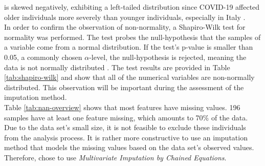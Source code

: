 is skewed negatively, exhibiting a left-tailed distribution since COVID-19 
affected older individuals more severely than younger individuals, especially 
in Italy \cite{RN193}. 
\\
In order to confirm the observation of non-normality, a Shapiro-Wilk test for 
normality was performed.
The test probes the null-hypothesis that the samples of a variable come from a 
normal distribution. If the test's p-value is smaller than 
0.05, a commonly chosen $\alpha$-level, the null-hypothesis is rejected, 
meaning the data is not normally distributed \cite{RN196}.
The test results are provided in Table \ref{tab:shapiro-wilk} and show 
that all of the numerical variables are non-normally distributed. This 
observation will be important during the assessment of the imputation method.
\\
Table \ref{tab:nan-overview} shows that most features have missing values. 196 
samples have at least one feature missing, which amounts to 70\% of the data. 
Due to the data set's small size, it is not feasible to exclude these 
individuals from the analysis process. It is rather more constructive to use an 
imputation method that models the missing values based on the data set's 
observed values. Therefore, \citeauthor{RN127} chose to use 
\textit{Multivariate 
Imputation by Chained Equations}. 
